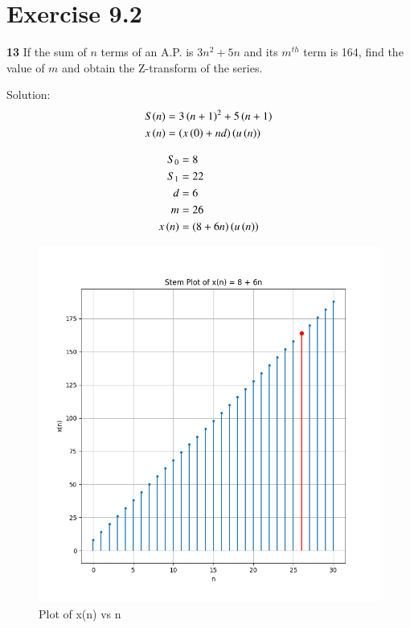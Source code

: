 \documentclass[journal,12pt,twocolumn]{IEEEtran}
\begin{document}


\vspace{3cm}

\title{}
\author{EE23BTECH11054 -  Sai Krishna Shanigarapu$^{*}$
}
\maketitle
\newpage
\bigskip


\section*{Exercise 9.2}

\noindent \textbf{13} \hspace{2pt}If the sum of $n$ terms of an A.P. is $3n^2+5n$ and its $m^{th}$ term is 164, find the value of $m$ and obtain the Z-transform of the series.
\bigskip

\noindent Solution:
\noindent
\begin{align}
S(n) &= 3\left(n+1\right)^2 + 5\left(n+1\right)\\
x\left(n\right) &= \left(x\left(0\right) + nd\right)\left(u\left(n\right)\right)
\end{align}

\begin{align}
   S_0 &= 8\\
   S_1 &=22\\
    d &= 6\\
    m &= 26\\
    x \left(n\right) &= \left(8 + 6n\right) \left(u\left(n\right)\right) \label{x(n)}
\end{align}

\begin{figure}[h]
    \centering
    \includegraphics[width=1\columnwidth]{figs/Figure_1.png}
    \caption{Plot of x(n) vs n}
    \label{fig:11.9.2.13.1}
\end{figure}
\end{document}
